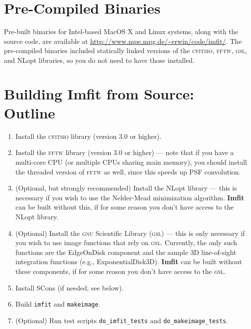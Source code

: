 \documentclass[10pt,a4paper,article]{memoir}
\newcommand{\Imfit}{\textbf{Imfit}}
\newcommand{\imfitprog}{\texttt{imfit}}
\newcommand{\makeimage}{\texttt{makeimage}}
\begin{document}
\section{Pre-Compiled Binaries}

Pre-built binaries for Intel-based MacOS X and Linux systems, along with
the source code, are available at
\url{http://www.mpe.mpg.de/~erwin/code/imfit/}. The pre-compiled
binaries included statically linked versions of the \textsc{cfitsio},
\textsc{fftw}, \textsc{gsl}, and NLopt libraries, so you do not need to
have those installed.


\section{Building \Imfit{} from Source: Outline}

\begin{enumerate}
\item Install the \textsc{cfitsio} library (version 3.0 or higher).

\item Install the \textsc{fftw} library (version 3.0 or higher) --- note that if you have a
multi-core CPU (or multiple CPUs sharing main memory), you should
install the threaded version of \textsc{fftw} as well, since this speeds up PSF
convolution.

\item (Optional, but strongly recommended) Install the NLopt library ---
this is necessary if you wish to use the Nelder-Mead minimization
algorithm. \Imfit{} can be built without this, if for some reason
you don't have access to the NLopt library.

\item (Optional) Install the \textsc{gnu} Scientific Library
(\textsc{gsl}) --- this is only necessary if you wish to use image
functions that rely on \textsc{gsl}.  Currently, the only such functions
are the EdgeOnDisk component and the sample 3D line-of-sight integration
functions (e.g., ExponentialDisk3D). \Imfit{} can be built without these
components, if for some reason you don't have access to the \textsc{gsl}.

\item Install SCons (if needed; see below).

\item Build \imfitprog{} and \makeimage.

\item (Optional) Run test scripts \texttt{do\_imfit\_tests} and \texttt{do\_makeimage\_tests}.

\end{enumerate}
\end{document}
